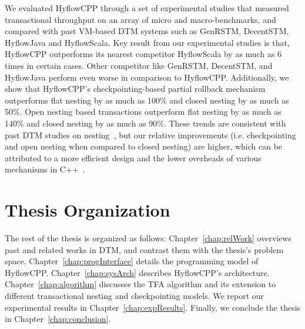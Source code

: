 \documentclass[12pt,english]{report}
\begin{document}
We evaluated HyflowCPP through a set of experimental studies that measured transactional throughput on an array of micro and macro-benchmarks, and compared with past VM-based DTM systems such as GenRSTM, DecentSTM, HyflowJava and HyflowScala.
Key result from our experimental studies is that, HyflowCPP outperforms its nearest competitor HyflowScala
by as much as 6 times in certain cases. Other competitor like GenRSTM, DecentSTM, and HyflowJava perform even worse in comparison to HyflowCPP.
Additionally, we show that HyflowCPP's checkpointing-based partial rollback mechanism outperforms flat nesting by as much as 100\% and closed nesting by as much as 50\%. 
Open nesting based transactions outperform flat nesting by as much as 140\% and closed nesting by as much as 90\%.
These trends are consistent with past DTM studies on nesting~\cite{turcu2012closed, turcu2012open}, 
but our relative improvements (i.e. checkpointing and open nesting when compared to closed nesting) are higher, which can be attributed to a more efficient design and the lower overheads of various mechanisms in C++~\cite{hundt2011loop}. 

\section{Thesis Organization}

The rest of the thesis is organized as follows: Chapter~\ref{chap:relWork} overviews past and related works in DTM, and contrast them with the thesis's problem space. Chapter~\ref{chap:progInterface} details the programming model of HyflowCPP. Chapter~\ref{chap:sysArch} describes HyflowCPP's architecture. Chapter~\ref{chap:algorithm} discusses the TFA algorithm and its extension to different transactional nesting and checkpointing models. We report our experimental results in Chapter~\ref{chap:expResults}. Finally, we conclude the thesis in Chapter~\ref{chap:conclusion}.
\end{document}
